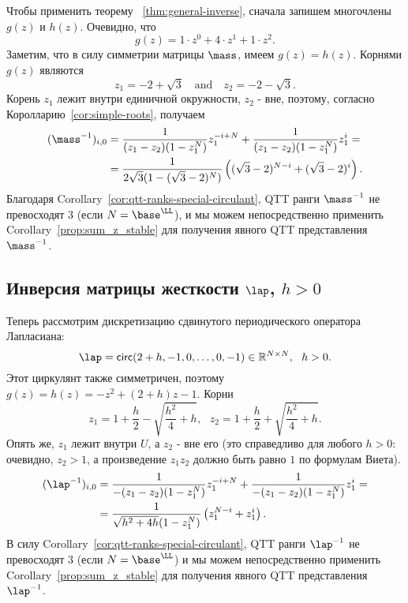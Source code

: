 Чтобы применить теорему ~\ref{thm:general-inverse}, сначала запишем многочлены $g(z)$ и $h(z)$.
Очевидно, что \[g(z) = 1\cdot z^0 + 4 \cdot z^1 + 1 \cdot z^2.\]
Заметим, что в силу симметрии матрицы $\mass$, имеем $g(z) = h(z)$.
Корнями $g(z)$ являются
\[z_{1} = -2+\sqrt{3} \quad \text{and}\quad z_{2} = -2- \sqrt{3}.\]
%
Корень $z_1$ лежит внутри единичной окружности, $z_2$ - вне, поэтому, согласно Королларию~\ref{cor:simple-roots}, получаем
\begin{align*}
(\mass^{-1})_{i,0} 
&=
\frac{1}{(z_1-z_2)(1-z_1^N)}z_1^{-i+N}
+
\frac{1}{(z_1-z_2)(1-z_1^N)}z_1^{i}
= \\ &=
\frac{1}{2\sqrt{3}(1-(\sqrt{3}-2)^N)}
\left(
(\sqrt{3}-2)^{N-i} + (\sqrt{3}-2)^{i}
\right).
\end{align*}
Благодаря Corollary~\ref{cor:qtt-ranks-special-circulant}, QTT ранги $\mass^{-1}$ не превосходят $3$ (если $N = \base^\LL$), и мы можем непосредственно применить Corollary~\ref{prop:sum_z_stable} для получения явного QTT представления $\mass^{-1}$.
\subsection{Инверсия матрицы жесткости $\lap$, $h>0$}
Теперь рассмотрим дискретизацию сдвинутого периодического оператора Лапласиана:
\[
\lap = \mathsf{circ}(2+h,-1,0,\dots,0,-1) \in \mathbb{R}^{N \times N},~~h > 0.
\]
Этот циркулянт также симметричен, поэтому $g(z) = h(z) = -z^2 + (2+h)z - 1$.
Корни
\[
z_{1} = 1 + \frac{h}{2} - \sqrt{\frac{h^2}{4}+h},
~~~
z_{2} = 1 + \frac{h}{2} + \sqrt{\frac{h^2}{4}+h}.
\]
Опять же, $z_1$ лежит внутри $U$, а $z_2$ - вне его (это справедливо для любого $h > 0$: очевидно, $z_2 > 1$, а произведение $z_1z_2$ должно быть равно $1$ по формулам Виета).
\begin{align*}
(\lap^{-1})_{i,0} 
&=
\frac{1}{-(z_1-z_2)(1-z_1^N)}z_1^{-i+N}
+
\frac{1}{-(z_1-z_2)(1-z_1^N)}z_1^{i}
= \\ &=
\frac{1}{\sqrt{h^2 + 4h}(1-z_1^N)}
\left(
z_1^{N-i} + z_1^{i}
\right).
\end{align*}
В силу Corollary~\ref{cor:qtt-ranks-special-circulant}, QTT ранги $\lap^{-1}$ не превосходят $3$ (если $N = \base^\LL$) и мы можем непосредственно применить Corollary~\ref{prop:sum_z_stable} для получения явного QTT представления $\lap^{-1}$.

